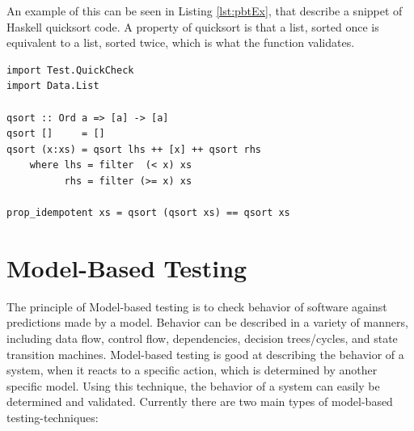An example of this can be seen in Listing \ref{lst:pbtEx}, that describe a snippet of Haskell quicksort code. A property of quicksort is that a list, sorted once is equivalent to a list, sorted twice, which is what the function  validates.

\begin{lstlisting}[caption={Example of Property-Based Testing. \cite{realWorldHaskell11}}, captionpos={below}, label={lst:pbtEx}]
import Test.QuickCheck
import Data.List

qsort :: Ord a => [a] -> [a]
qsort []     = []
qsort (x:xs) = qsort lhs ++ [x] ++ qsort rhs
    where lhs = filter  (< x) xs
          rhs = filter (>= x) xs

prop_idempotent xs = qsort (qsort xs) == qsort xs
\end{lstlisting}


\section{Model-Based Testing}

The principle of Model-based testing is to check behavior of software against predictions made by a model. Behavior can be described in a variety of manners, including data flow, control flow, dependencies, decision trees/cycles, and state transition machines. Model-based testing is good at describing the behavior of a system, when it reacts to a specific action, which is determined by another specific model. Using this technique, the behavior of a system can easily be determined and validated. Currently there are two main types of model-based testing-techniques:

